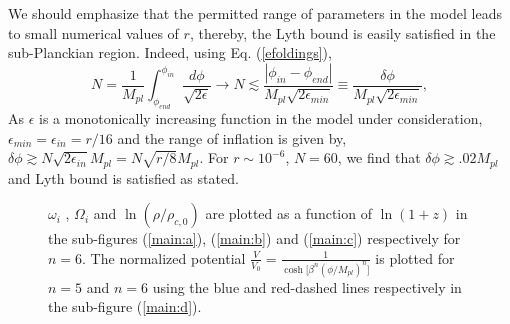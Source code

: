 \documentclass[prd,twocolumn,superscriptaddress]{revtex4}
\begin{document}
We should emphasize that the permitted range of parameters  in the model leads to small 
numerical values of $r$, thereby, the Lyth bound \cite{ala} is easily satisfied in the sub-Planckian region.
Indeed, using Eq. (\ref{efoldings}), 
\begin{equation}
 N=\frac{1}{M_{pl}} \int^{\phi_{in}}_{\phi_{end}} \frac{d \phi}{\sqrt{2 \epsilon}}
 \to N\lesssim \frac{|\phi_{in}-\phi_{end}|}{M_{pl}\sqrt{2 \epsilon_{min}}}\equiv \frac{\delta \phi}{M_{pl}\sqrt{2 \epsilon_{min}}},
\end{equation}
As $\epsilon$ is a monotonically increasing function in the model under consideration,  $\epsilon_{min}= \epsilon_{in}=r/16$ and the range of inflation is given by,
$\delta \phi \gtrsim N \sqrt{2 \epsilon_{in}} M_{pl}=N\sqrt{r/8} M_{pl}$. For $r\sim 10^{-6}$, $N=60$, we find that $\delta\phi\gtrsim .02 M_{pl}$ and Lyth bound is satisfied as stated.

\begin{figure*}
\begin{minipage}{.47\linewidth}
\centering
{}
\end{minipage}%
\begin{minipage}{.47\linewidth}
\centering
{}
\end{minipage}\par\medskip
\begin{minipage}{.47\linewidth}
\centering
{}
\end{minipage}%
\begin{minipage}{.47\linewidth}
\centering
{}
\end{minipage}\par\medskip
\caption{ $\omega_{i}$ ,  $\Omega_{i}$ and  $\ln(\rho/\rho_{c,0})$
are plotted as a function of $\ln{(1+z)}$ in the sub-figures (\ref{main:a}), (\ref{main:b}) and (\ref{main:c})
  respectively  for $n=6$.  The normalized potential $\frac{V}{V_0} = \frac{1}{\cosh \big[ \beta^n \left(\phi/M_{pl}\right)^n\big]}$ is
  plotted for $n=5$ and $n=6$ using the blue and red-dashed lines respectively in the sub-figure (\ref{main:d}).}
  \label{evolution}
\end{figure*}
\end{document}

